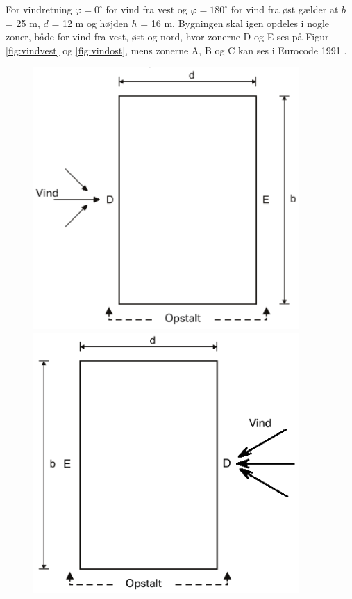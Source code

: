 For vindretning $\varphi = 0^{\circ}$ for vind fra vest og $\varphi = 180^{\circ}$ for vind fra øst gælder at $b$ = 25 m, $d$ = 12 m og højden $h$ = 16 m. Bygningen skal igen opdeles i nogle zoner, både for vind fra vest, øst og nord, hvor zonerne D og E ses på Figur \ref{fig:vindvest} og \ref{fig:vindost}, mens zonerne A, B og C kan ses i Eurocode 1991 \citep [kapitel 7.2.2 figur 7.5]{EU91}.

\begin{figure}[htbp]\centering
	\begin{minipage}[b]{0.48\textwidth}\centering
		\includegraphics[width=0.9\textwidth]{billeder/vindvest1.png} %
	\end{minipage}\hfill
	\begin{minipage}[b]{0.48\textwidth}\centering
		\includegraphics[width=0.9\textwidth]{billeder/vindost1.png} %

\end{minipage}
\end{figure}
